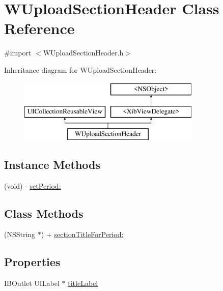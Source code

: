 \hypertarget{interface_w_upload_section_header}{\section{W\-Upload\-Section\-Header Class Reference}
\label{interface_w_upload_section_header}
}


{\ttfamily \#import $<$W\-Upload\-Section\-Header.\-h$>$}

Inheritance diagram for W\-Upload\-Section\-Header\-:\begin{figure}[H]
\begin{center}
\leavevmode
\includegraphics[height=3.000000cm]{interface_w_upload_section_header}
\end{center}
\end{figure}
\subsection*{Instance Methods}
\begin{DoxyCompactItemize}
\item 
(void) -\/ \hyperlink{interface_w_upload_section_header_a7dd30dfecbdb190de3e66b1c88ad8b3f}{set\-Period\-:}
\end{DoxyCompactItemize}
\subsection*{Class Methods}
\begin{DoxyCompactItemize}
\item 
(N\-S\-String $\ast$) + \hyperlink{interface_w_upload_section_header_aa8a2b32f2646bb3cf6cb42249de04c50}{section\-Title\-For\-Period\-:}
\end{DoxyCompactItemize}
\subsection*{Properties}
\begin{DoxyCompactItemize}
\item 
I\-B\-Outlet U\-I\-Label $\ast$ \hyperlink{interface_w_upload_section_header_a755cf2ba3936708bff7c0911b405ea17}{title\-Label}
\end{DoxyCompactItemize}


